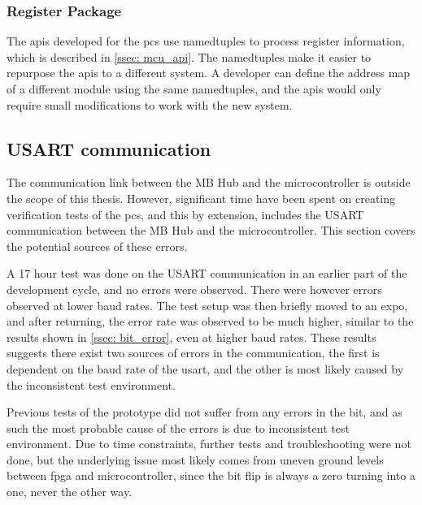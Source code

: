 \documentclass[main.tex]{subfiles}
\begin{document}
 \subsubsection{Register Package}
 
The \gls{api}s developed for the \gls{pcs} use namedtuples to process register information, which is described in \autoref{ssec: mcu_api}. The namedtuples make it easier to repurpose the \gls{api}s to a different system. A developer can define the address map of a different module using the same namedtuples, and the \gls{api}s would only require small modifications to work with the new system.
 
\subsection{USART communication}

The communication link between the MB Hub and the microcontroller is outside the scope of this thesis. However, significant time have been spent on creating verification tests of the \gls{pcs}, and this by extension, includes the USART communication between the MB Hub and the microcontroller. This section covers the potential sources of these errors.

A 17 hour test was done on the USART communication in an earlier part of the development cycle, and no errors were observed. There were however errors observed at lower baud rates. The test setup was then briefly moved to an expo, and after returning, the error rate was observed to be much higher, similar to the results shown in \autoref{ssec: bit_error}, even at higher baud rates. These results suggests there exist two sources of errors in the communication, the first is dependent on the baud rate of the \gls{usart}, and the other is most likely caused by the inconsistent test environment. 

Previous tests of the prototype did not suffer from any errors in the bit, and as such the most probable cause of the errors is due to inconsistent test environment. Due to time constraints, further tests and troubleshooting were not done, but the underlying issue most likely comes from uneven ground levels between \gls{fpga} and microcontroller, since the bit flip is always a zero turning into a one, never the other way.
\end{document}

